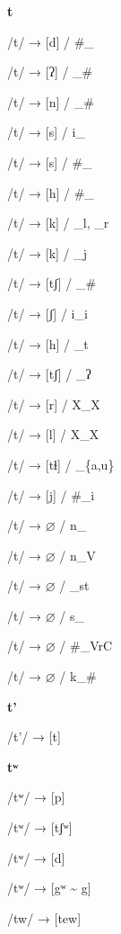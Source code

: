 \begin{center}\textbf{t}\end{center}
\begin{multicols}{4}
\noindent /t/ → [d] / \#\_

\noindent /t/ → [ʔ] / \_\#

\noindent /t/ → [n] / \_\#

\noindent /t/ → [s] / i\_

\noindent /t/ → [s] / \#\_

\noindent /t/ → [h] / \#\_

\noindent /t/ → [k] / \_l, \_r

\noindent /t/ → [k] / \_j

\noindent /t/ → [tʃ] / \_\#

\noindent /t/ → [ʃ] / i\_i

\noindent /t/ → [h] / \_t

\noindent /t/ → [tʃ] / \_ʔ

\noindent /t/ → [r] / X\_X

\noindent /t/ → [l] / X\_X

\noindent /t/ → [tɬ] / \_\{a,u\}

\noindent /t/ → [j] / \#\_i

\noindent /t/ → $\varnothing$ / n\_

\noindent /t/ → $\varnothing$ / n\_V

\noindent /t/ → $\varnothing$ / \_st

\noindent /t/ → $\varnothing$ / s\_

\noindent /t/ → $\varnothing$ / \#\_VrC

\noindent /t/ → $\varnothing$ / k\_\#
\end{multicols}


\begin{center}\textbf{t'}\end{center}
\begin{multicols}{4}
\noindent /t'/ → [t]
\end{multicols}


\begin{center}\textbf{tʷ}\end{center}
\begin{multicols}{4}
\noindent /tʷ/ → [p]

\noindent /tʷ/ → [tʃʷ]

\noindent /tʷ/ → [d]

\noindent /tʷ/ → [gʷ \textasciitilde{} g]

\noindent /tw/ → [tew]
\end{multicols}

